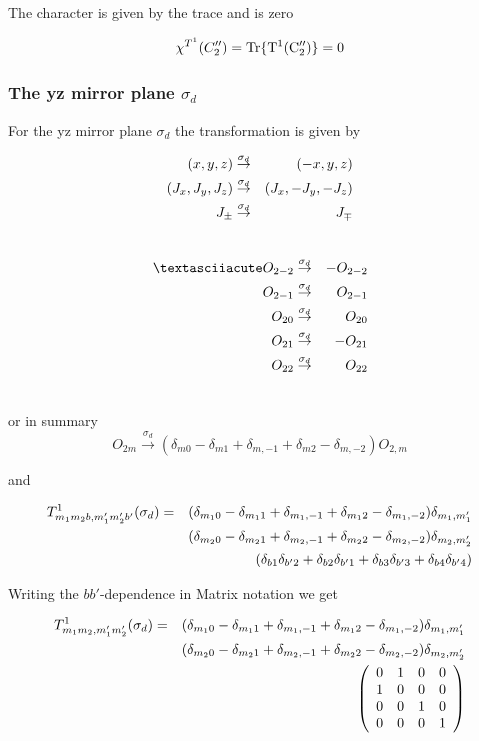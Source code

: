 The character is given by the trace and is zero

\begin{equation}
\chi^{T^1}(C''_2)=\rm Tr \{ T^1(C''_2) \}=0
\end{equation}


\subsubsection{The yz mirror plane  $\sigma_d$}

For the yz mirror plane $\sigma_d$ the transformation is given by

\begin{eqnarray}
(x,y,z) &\stackrel{\sigma_d}{\rightarrow}& (-x,y,z) \\ \nonumber
(J_x,J_y,J_z) &\stackrel{\sigma_d}{\rightarrow}&  (J_x,-J_y,-J_z) \\ \nonumber
J_\pm &\stackrel{\sigma_d}{\rightarrow}&  J_\mp \\ \nonumber
\end{eqnarray}

\begin{eqnarray}
´O_{2-2}&\stackrel{\sigma_d}{\rightarrow}&-O_{2-2} \nn
O_{2-1}&\stackrel{\sigma_d}{\rightarrow}&O_{2-1} \nn
O_{20}&\stackrel{\sigma_d}{\rightarrow}&O_{20} \nn
O_{21}&\stackrel{\sigma_d}{\rightarrow}&-O_{21}\nn
O_{22}&\stackrel{\sigma_d}{\rightarrow}&O_{22}\nn
\end{eqnarray}

or in summary
\begin{equation}
O_{2m}\stackrel{\sigma_d}{\rightarrow} (\delta_{m0}-\delta_{m1}+\delta_{m,-1}+\delta_{m2}-\delta_{m,-2}) O_{2,m} 
\end{equation}

and 

\begin{eqnarray}
T^1_{m_1m_2b,m'_1m'_2b'}(\sigma_d)&=&(\delta_{m_10}-\delta_{m_11}+\delta_{m_1,-1}+\delta_{m_12}-\delta_{m_1,-2})
\delta_{m_1,m'_1}\\ \nonumber
&&(\delta_{m_20}-\delta_{m_21}+\delta_{m_2,-1}+\delta_{m_22}-\delta_{m_2,-2})
\delta_{m_2,m'_2}\\ \nonumber
&&(\delta_{b1}\delta_{b'2}+\delta_{b2}\delta_{b'1}+\delta_{b3}\delta_{b'3}+\delta_{b4}\delta_{b'4})
\end{eqnarray}

Writing the $bb'$-dependence in Matrix notation we get

\begin{eqnarray}\label{sd}
T^1_{m_1m_2,m'_1m'_2}(\sigma_d)&=&(\delta_{m_10}-\delta_{m_11}+\delta_{m_1,-1}+\delta_{m_12}-\delta_{m_1,-2})
\delta_{m_1,m'_1}\\ \nonumber
&&(\delta_{m_20}-\delta_{m_21}+\delta_{m_2,-1}+\delta_{m_22}-\delta_{m_2,-2})
\delta_{m_2,m'_2}\\ \nonumber
&&\left (
\begin{array}{cccc}
0 & 1 & 0 & 0 \\
1 & 0 & 0 & 0 \\
0 & 0 & 1 & 0 \\
0 & 0 & 0 & 1 
\end{array} \right )
\end{eqnarray}

